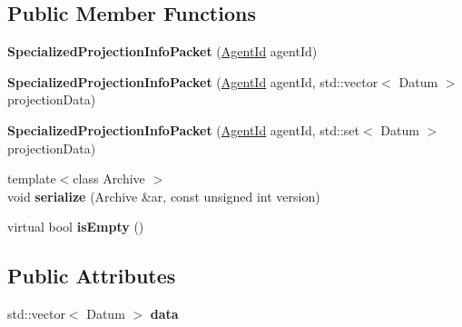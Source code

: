 \subsection*{Public Member Functions}
\begin{DoxyCompactItemize}
\item 
\hypertarget{classrepast_1_1_specialized_projection_info_packet_aa19733bc5490ce0041e48ea7004414de}{{\bfseries Specialized\-Projection\-Info\-Packet} (\hyperlink{classrepast_1_1_agent_id}{Agent\-Id} agent\-Id)}\label{classrepast_1_1_specialized_projection_info_packet_aa19733bc5490ce0041e48ea7004414de}

\item 
\hypertarget{classrepast_1_1_specialized_projection_info_packet_a14d8cf26c90b17629f75dc63868336fa}{{\bfseries Specialized\-Projection\-Info\-Packet} (\hyperlink{classrepast_1_1_agent_id}{Agent\-Id} agent\-Id, std\-::vector$<$ Datum $>$ projection\-Data)}\label{classrepast_1_1_specialized_projection_info_packet_a14d8cf26c90b17629f75dc63868336fa}

\item 
\hypertarget{classrepast_1_1_specialized_projection_info_packet_a355dbd87c43525f04cfe1b9172d3e319}{{\bfseries Specialized\-Projection\-Info\-Packet} (\hyperlink{classrepast_1_1_agent_id}{Agent\-Id} agent\-Id, std\-::set$<$ Datum $>$ projection\-Data)}\label{classrepast_1_1_specialized_projection_info_packet_a355dbd87c43525f04cfe1b9172d3e319}

\item 
\hypertarget{classrepast_1_1_specialized_projection_info_packet_a9f64552bdc945d9f73e139c693b5fb8b}{{\footnotesize template$<$class Archive $>$ }\\void {\bfseries serialize} (Archive \&ar, const unsigned int version)}\label{classrepast_1_1_specialized_projection_info_packet_a9f64552bdc945d9f73e139c693b5fb8b}

\item 
\hypertarget{classrepast_1_1_specialized_projection_info_packet_ad1ef0fbc2bc1725b20f56e1c4f0dadc6}{virtual bool {\bfseries is\-Empty} ()}\label{classrepast_1_1_specialized_projection_info_packet_ad1ef0fbc2bc1725b20f56e1c4f0dadc6}

\end{DoxyCompactItemize}
\subsection*{Public Attributes}
\begin{DoxyCompactItemize}
\item 
\hypertarget{classrepast_1_1_specialized_projection_info_packet_a88d3c001e9393ca76753b7b0f33ccb55}{std\-::vector$<$ Datum $>$ {\bfseries data}}\label{classrepast_1_1_specialized_projection_info_packet_a88d3c001e9393ca76753b7b0f33ccb55}

\end{DoxyCompactItemize}
